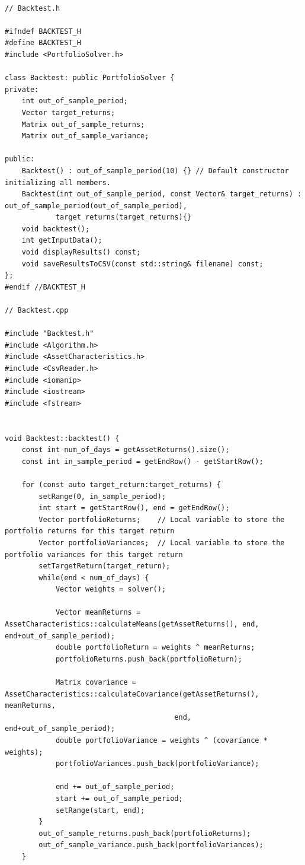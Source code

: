 \documentclass[12pt,twoside]{article}
\begin{document}
\begin{verbatim}

// Backtest.h

#ifndef BACKTEST_H
#define BACKTEST_H
#include <PortfolioSolver.h>

class Backtest: public PortfolioSolver {
private:
    int out_of_sample_period;
    Vector target_returns;
    Matrix out_of_sample_returns;
    Matrix out_of_sample_variance;

public:
    Backtest() : out_of_sample_period(10) {} // Default constructor initializing all members.
    Backtest(int out_of_sample_period, const Vector& target_returns) : out_of_sample_period(out_of_sample_period),
            target_returns(target_returns){}
    void backtest();
    int getInputData();
    void displayResults() const;
    void saveResultsToCSV(const std::string& filename) const;
};
#endif //BACKTEST_H

// Backtest.cpp

#include "Backtest.h"
#include <Algorithm.h>
#include <AssetCharacteristics.h>
#include <CsvReader.h>
#include <iomanip>
#include <iostream>
#include <fstream>


void Backtest::backtest() {
    const int num_of_days = getAssetReturns().size();
    const int in_sample_period = getEndRow() - getStartRow();

    for (const auto target_return:target_returns) {
        setRange(0, in_sample_period);
        int start = getStartRow(), end = getEndRow();
        Vector portfolioReturns;    // Local variable to store the portfolio returns for this target return
        Vector portfolioVariances;  // Local variable to store the portfolio variances for this target return
        setTargetReturn(target_return);
        while(end < num_of_days) {
            Vector weights = solver();

            Vector meanReturns = AssetCharacteristics::calculateMeans(getAssetReturns(), end, end+out_of_sample_period);
            double portfolioReturn = weights ^ meanReturns;
            portfolioReturns.push_back(portfolioReturn);

            Matrix covariance = AssetCharacteristics::calculateCovariance(getAssetReturns(), meanReturns, 
                                        end, end+out_of_sample_period);
            double portfolioVariance = weights ^ (covariance * weights);
            portfolioVariances.push_back(portfolioVariance);

            end += out_of_sample_period;
            start += out_of_sample_period;
            setRange(start, end);
        }
        out_of_sample_returns.push_back(portfolioReturns);
        out_of_sample_variance.push_back(portfolioVariances);
    }


\end{verbatim}
\end{document}
